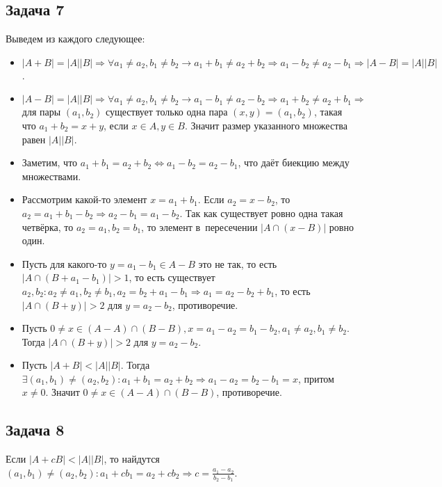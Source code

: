 \documentclass{article}
\begin{document}
\subsection*{Задача 7}
	Выведем из каждого следующее:
	\begin{itemize}
		\item $|A + B| = |A||B| \Rightarrow \forall a_1 \ne a_2, b_1 \ne b_2
			\rightarrow a_1 + b_1 \ne a_2 + b_2 \Rightarrow a_1 - b_2 \ne a_2 - b_1
			\Rightarrow |A - B| = |A||B|$.
		\item $|A - B| = |A||B| \Rightarrow \forall a_1 \ne a_2, b_1 \ne b_2
			\rightarrow a_1 - b_1 \ne a_2 - b_2 \Rightarrow a_1 + b_2 \ne a_2 + b_1
			\Rightarrow$ для пары $(a_1, b_2)$ существует только одна пара $(x, y) =
			(a_1, b_2)$, такая что $a_1 + b_2 = x + y$, если $x \in A, y \in B$.
			Значит размер указанного множества равен $|A||B|$.
		\item Заметим, что $a_1 + b_1 = a_2 + b_2 \Leftrightarrow a_1 - b_2 = a_2 -
			b_1$, что даёт биекцию между множествами.
		\item Рассмотрим какой-то элемент $x = a_1 + b_1$. Если $a_2 = x - b_2$, то
			$a_2 = a_1 + b_1 - b_2 \Rightarrow a_2 - b_1 = a_1 - b_2$. Так как
			существует ровно одна такая четвёрка, то $a_2 = a_1, b_2 = b_1$, то
			элемент в~пересечении $|A \cap (x - B)|$ ровно один.
		\item Пусть для какого-то $y = a_1 - b_1 \in A - B$ это не так, то есть $|A
			\cap (B + a_1 - b_1)| > 1$, то есть существует $a_2, b_2: a_2 \ne a_1, b_2
			\ne b_1, a_2 = b_2 + a_1 - b_1 \Rightarrow a_1 = a_2 - b_2 + b_1$, то есть
			$|A \cap (B + y)| > 2$ для $y = a_2 - b_2$, противоречие.
		\item Пусть $0 \ne x \in (A - A) \cap (B - B), x = a_1 - a_2 = b_1 - b_2,
			a_1 \ne a_2, b_1 \ne b_2$. Тогда $|A \cap (B + y)| > 2$ для $y = a_2 -
			b_2$.
		\item Пусть $|A + B| < |A||B|$. Тогда $\exists (a_1, b_1) \ne (a_2, b_2):
			a_1 + b_1 = a_2 + b_2 \Rightarrow a_1 - a_2 = b_2 - b_1 = x$, притом $x
			\ne 0$. Значит $0 \ne x \in (A - A) \cap (B - B)$, противоречие.
	\end{itemize}

\subsection*{Задача 8}
	Если $|A + cB| < |A||B|$, то найдутся $(a_1, b_1) \ne (a_2, b_2): a_1 + cb_1 =
	a_2 + cb_2 \Rightarrow c = \frac{a_1 - a_2}{b_2 - b_1}$.
\end{document}
